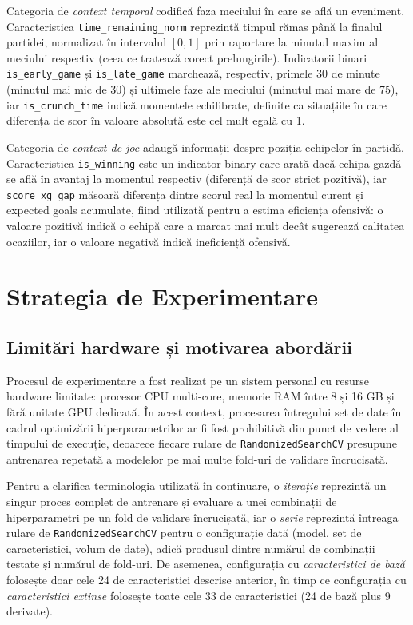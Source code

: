 Categoria de \textit{context temporal} codifică faza meciului în care se
află un eveniment. Caracteristica \texttt{time\_remaining\_norm} reprezintă
timpul rămas până la finalul partidei, normalizat în intervalul $[0, 1]$
prin raportare la minutul maxim al meciului respectiv (ceea ce tratează
corect prelungirile). Indicatorii binari \texttt{is\_early\_game} și
\texttt{is\_late\_game} marchează, respectiv, primele 30 de minute
(minutul mai mic de 30) și ultimele faze ale meciului (minutul mai mare de
75), iar \texttt{is\_crunch\_time} indică momentele echilibrate, definite
ca situațiile în care diferența de scor în valoare absolută este cel mult
egală cu 1.

Categoria de \textit{context de joc} adaugă informații despre poziția
echipelor în partidă. Caracteristica \texttt{is\_winning} este un indicator
binary care arată dacă echipa gazdă se află în avantaj la momentul
respectiv (diferență de scor strict pozitivă), iar \texttt{score\_xg\_gap}
măsoară diferența dintre scorul real la momentul curent și expected goals
acumulate, fiind utilizată pentru a estima eficiența ofensivă: o valoare
pozitivă indică o echipă care a marcat mai mult decât sugerează calitatea
ocaziilor, iar o valoare negativă indică ineficiență ofensivă.

\section{Strategia de Experimentare}

\subsection{Limitări hardware și motivarea abordării}

Procesul de experimentare a fost realizat pe un sistem personal cu resurse
hardware limitate: procesor CPU multi-core, memorie RAM între 8 și 16 GB
și fără unitate GPU dedicată. În acest context, procesarea întregului set
de date în cadrul optimizării hiperparametrilor ar fi fost prohibitivă din
punct de vedere al timpului de execuție, deoarece fiecare rulare de
\texttt{RandomizedSearchCV} presupune antrenarea repetată a modelelor pe
mai multe fold-uri de validare încrucișată.

Pentru a clarifica terminologia utilizată în continuare, o
\textit{iterație} reprezintă un singur proces complet de antrenare și
evaluare a unei combinații de hiperparametri pe un fold de validare
încrucișată, iar o \textit{serie} reprezintă întreaga rulare de
\texttt{RandomizedSearchCV} pentru o configurație dată (model, set de
caracteristici, volum de date), adică produsul dintre numărul de combinații
testate și numărul de fold-uri. De asemenea, configurația cu
\textit{caracteristici de bază} folosește doar cele 24 de caracteristici
descrise anterior, în timp ce configurația cu \textit{caracteristici
extinse} folosește toate cele 33 de caracteristici (24 de bază plus 9
derivate).

